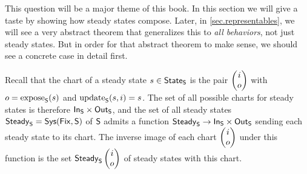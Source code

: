 \documentclass[DynamicalBook]{subfiles}
\begin{document}
This question will be a major theme of this book. In this section we will give a
taste by showing how steady states compose. Later, in \cref{sec.representables}, we will see a very abstract
theorem that generalizes this to \emph{all behaviors}, not just steady states.
But in order for that abstract theorem to make sense, we should see a concrete
case in detail first.  

Recall that the chart of a steady state $s \in \mathsf{State}_{\mathsf{S}}$ is the pair
$\begin{pmatrix}{i} \\ {o} \end{pmatrix}$ with $o = \mathrm{expose}_{\mathsf{S}}(s)$ and $\mathrm{update}_{\mathsf{S}}(s, i) = s$. The set of all
possible charts for steady states is therefore $\mathsf{In}_{\mathsf{S}} \times \mathsf{Out}_{\mathsf{S}}$, and the
set of all steady states $\mathsf{Steady}_{\mathsf{S}} = \mathsf{Sys}(\mathsf{Fix}, \mathsf{S})$ of $\mathsf{S}$ admits a function
$\mathsf{Steady}_{\mathsf{S}} \to \mathsf{In}_{\mathsf{S}} \times \mathsf{Out}_{\mathsf{S}}$ sending each steady state to
its chart. The inverse image of each chart $\begin{pmatrix}{i} \\ {o} \end{pmatrix}$ under this function is
the set $\mathsf{Steady}_{\mathsf{S}}\begin{pmatrix}{i} \\ {o} \end{pmatrix}$ of steady states with this chart.
\end{document}
